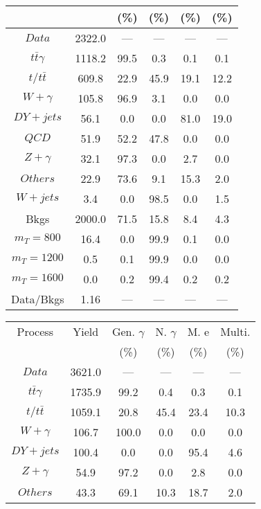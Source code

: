 \begin{figure}
\begin{minipage}[c]{0.32\textwidth}
{\begin{tabular}{cccccc}
 &  & (\%) & (\%) & (\%) & (\%)  \\
\hline
                                                                      $ Data $ &  2322.0 &  --- &  --- &  --- &  ---\\
$ t\bar{t}\gamma $ &  1118.2 &  99.5 &  0.3 &  0.1 &  0.1\\
$ t/t\bar{t} $ &  609.8 &  22.9 &  45.9 &  19.1 &  12.2\\
$ W+\gamma $ &  105.8 &  96.9 &  3.1 &  0.0 &  0.0\\
$ DY+jets $ &  56.1 &  0.0 &  0.0 &  81.0 &  19.0\\
$ QCD $ &  51.9 &  52.2 &  47.8 &  0.0 &  0.0\\
$ Z+\gamma $ &  32.1 &  97.3 &  0.0 &  2.7 &  0.0\\
$ Others $ &  22.9 &  73.6 &  9.1 &  15.3 &  2.0\\
$ W+jets $ &  3.4 &  0.0 &  98.5 &  0.0 &  1.5\\
Bkgs &  2000.0 &  71.5 &  15.8 &  8.4 &  4.3\\
$ m_{T} = 800 $ &  16.4 &  0.0 &  99.9 &  0.1 &  0.0\\
$ m_{T} = 1200 $ &  0.5 &  0.1 &  99.9 &  0.0 &  0.0\\
$ m_{T} = 1600 $ &  0.0 &  0.2 &  99.4 &  0.2 &  0.2\\
Data/Bkgs &  1.16 &  --- &  --- &  --- &  ---\\
\hline
\end{tabular}
}
\end{minipage}
\begin{minipage}[c]{0.32\textwidth}
\centering
\tiny{
\begin{tabular}{cccccc}
\hline
Process & Yield & Gen. $\gamma$ & N. $\gamma$ & M. e & Multi. \\
 &  & (\%) & (\%) & (\%) & (\%)  \\
\hline
                                                                      $ Data $ &  3621.0 &  --- &  --- &  --- &  ---\\
$ t\bar{t}\gamma $ &  1735.9 &  99.2 &  0.4 &  0.3 &  0.1\\
$ t/t\bar{t} $ &  1059.1 &  20.8 &  45.4 &  23.4 &  10.3\\
$ W+\gamma $ &  106.7 &  100.0 &  0.0 &  0.0 &  0.0\\
$ DY+jets $ &  100.4 &  0.0 &  0.0 &  95.4 &  4.6\\
$ Z+\gamma $ &  54.9 &  97.2 &  0.0 &  2.8 &  0.0\\
$ Others $ &  43.3 &  69.1 &  10.3 &  18.7 &  2.0\\

\end{tabular}}
\end{minipage}
\end{figure}
